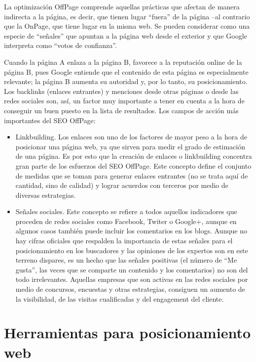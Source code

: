 La optimización OffPage comprende aquellas prácticas que afectan de manera indirecta a la página, es decir, que tienen lugar “fuera” de la página –al contrario que la OnPage, que tiene lugar en la misma web. Se pueden considerar como una especie de “señales” que apuntan a la página web desde el exterior y que Google interpreta como “votos de confianza”.

Cuando la página A enlaza a la página B, favorece a la reputación online de la página B, pues Google entiende que el contenido de esta página es especialmente relevante; la página B aumenta su autoridad y, por lo tanto, su posicionamiento. Los backlinks (enlaces entrantes) y menciones desde otras páginas o desde las redes sociales son, así, un factor muy importante a tener en cuenta a la hora de conseguir un buen puesto en la lista de resultados. Los campos de acción más importantes del SEO OffPage:
\begin{itemize}
    \item Linkbuilding. Los enlaces son uno de los factores de mayor peso a la hora de posicionar una página web, ya que sirven para medir el grado de estimación de una página. Es por esto que la creación de enlaces o linkbuilding concentra gran parte de los esfuerzos del SEO OffPage. Este concepto define el conjunto de medidas que se toman para generar enlaces entrantes (no se trata aquí de cantidad, sino de calidad) y lograr acuerdos con terceros por medio de diversas estrategias.
    \item Señales sociales. Este concepto se refiere a todos aquellos indicadores que proceden de redes sociales como Facebook, Twiter o Google+, aunque en algunos casos también puede incluir los comentarios en los blogs. Aunque no hay cifras oficiales que respalden la importancia de estas señales para el posicionamiento en los buscadores y las opiniones de los expertos son en este terreno dispares,  es un hecho que las señales positivas (el número de “Me gusta”, las veces que se comparte un contenido y los comentarios) no son del todo irrelevantes. Aquellas empresas que son activas en las redes sociales por medio de concursos, encuestas y otras estrategias, consiguen un aumento de la visibilidad, de las visitas cualificadas y del engagement del cliente.
\end{itemize}

\section{Herramientas para posicionamiento web}

